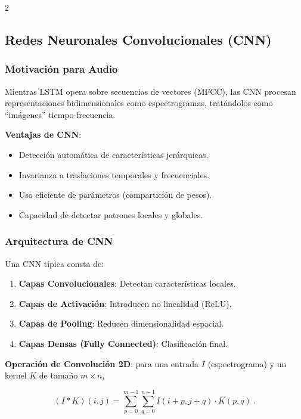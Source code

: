 \documentclass[12pt]{report}
\newenvironment{tightmulticols}{%
  \begin{multicols}{2}
  \setlength{\parskip}{1.2pt}
  \linespread{1}\selectfont
}{%
  \end{multicols}
}
\begin{document}
\begin{tightmulticols}
\subsection{Redes Neuronales Convolucionales (CNN)}

\subsubsection{Motivación para Audio}

\noindent Mientras LSTM opera sobre secuencias de vectores (MFCC), las CNN procesan representaciones bidimensionales como espectrogramas, tratándolos como ``imágenes'' tiempo-frecuencia.

\noindent\textbf{Ventajas de CNN}:
\begin{itemize}
    \item Detección automática de características jerárquicas.
    \item Invarianza a traslaciones temporales y frecuenciales.
    \item Uso eficiente de parámetros (compartición de pesos).
    \item Capacidad de detectar patrones locales y globales.
\end{itemize}

\subsubsection{Arquitectura de CNN}

\noindent Una CNN típica consta de:

\begin{enumerate}
    \item \textbf{Capas Convolucionales}: Detectan características locales.
    \item \textbf{Capas de Activación}: Introducen no linealidad (ReLU).
    \item \textbf{Capas de Pooling}: Reducen dimensionalidad espacial.
    \item \textbf{Capas Densas (Fully Connected)}: Clasificación final.
\end{enumerate}

\noindent\textbf{Operación de Convolución 2D}: para una entrada $I$ (espectrograma) y un kernel $K$ de tamaño $m \times n$,

\begin{equation*}
    (I * K)(i, j) = \sum_{p=0}^{m-1} \sum_{q=0}^{n-1} I(i+p, j+q) \cdot K(p, q) \; .
\end{equation*}


\end{tightmulticols}
\end{document}
